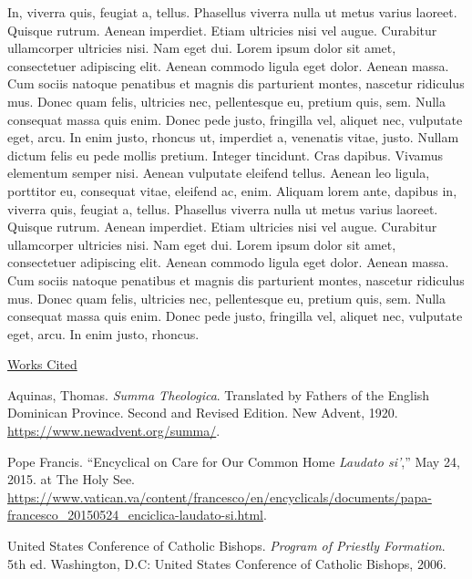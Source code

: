 \documentclass[
    12pt,
    letterpaper,
    oneside,
    noraggedright
]{turabian-researchpaper}
\newlength{\cslhangindent}
\newenvironment{CSLReferences}[2]
 {
\newpage %
\centerline{\underline{Works Cited}} %
 \setlength{\parindent}{0pt}
 \singlespacing
  \let\oldpar\par
  \def\par{\hangindent=\cslhangindent\oldpar}
  \setlength{\parskip}{1em}
 }
{
}
\begin{document}
In, viverra quis, feugiat a, tellus. Phasellus viverra nulla ut metus
varius laoreet. Quisque rutrum. Aenean imperdiet. Etiam ultricies nisi
vel augue. Curabitur ullamcorper ultricies nisi. Nam eget dui. Lorem
ipsum dolor sit amet, consectetuer adipiscing elit. Aenean commodo
ligula eget dolor. Aenean massa. Cum sociis natoque penatibus et magnis
dis parturient montes, nascetur ridiculus mus. Donec quam felis,
ultricies nec, pellentesque eu, pretium quis, sem. Nulla consequat massa
quis enim. Donec pede justo, fringilla vel, aliquet nec, vulputate eget,
arcu. In enim justo, rhoncus ut, imperdiet a, venenatis vitae, justo.
Nullam dictum felis eu pede mollis pretium. Integer tincidunt. Cras
dapibus. Vivamus elementum semper nisi. Aenean vulputate eleifend
tellus. Aenean leo ligula, porttitor eu, consequat vitae, eleifend ac,
enim. Aliquam lorem ante, dapibus in, viverra quis, feugiat a, tellus.
Phasellus viverra nulla ut metus varius laoreet. Quisque rutrum. Aenean
imperdiet. Etiam ultricies nisi vel augue. Curabitur ullamcorper
ultricies nisi. Nam eget dui. Lorem ipsum dolor sit amet, consectetuer
adipiscing elit. Aenean commodo ligula eget dolor. Aenean massa. Cum
sociis natoque penatibus et magnis dis parturient montes, nascetur
ridiculus mus. Donec quam felis, ultricies nec, pellentesque eu, pretium
quis, sem. Nulla consequat massa quis enim. Donec pede justo, fringilla
vel, aliquet nec, vulputate eget, arcu. In enim justo, rhoncus.

\hypertarget{refs}{}
\begin{CSLReferences}{1}{0}
\leavevmode{}%
Aquinas, Thomas. \emph{Summa Theologica}. Translated by Fathers of the
English Dominican Province. Second and Revised Edition. New Advent,
1920. \url{https://www.newadvent.org/summa/}.

\leavevmode{}%
Pope Francis. {``Encyclical on Care for Our Common Home \emph{Laudato
si'},''} May 24, 2015. at The Holy See.
\url{https://www.vatican.va/content/francesco/en/encyclicals/documents/papa-francesco_20150524_enciclica-laudato-si.html}.

\leavevmode{}%
United States Conference of Catholic Bishops. \emph{Program of Priestly
Formation}. 5th ed. Washington, D.C: United States Conference of
Catholic Bishops, 2006.

\end{CSLReferences}
\end{document}
